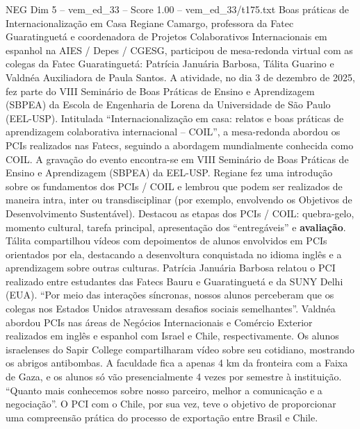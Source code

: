 \begin{textsample}{NEG Dim 5 – vem\_ed\_33 – Score 1.00 – vem\_ed\_33/t175.txt}  \label{ex:f5_neg_069}
Boas práticas de Internacionalização em Casa Regiane Camargo, professora da Fatec Guaratinguetá e coordenadora de Projetos Colaborativos Internacionais em espanhol na AIES / Depes / CGESG, participou de mesa-redonda virtual com as colegas da Fatec Guaratinguetá: Patrícia Januária Barbosa, Tálita Guarino e Valdnéa Auxiliadora de Paula Santos.
A atividade, no dia 3 de dezembro de 2025, fez parte do VIII Seminário de Boas Práticas de Ensino e Aprendizagem (SBPEA) da Escola de Engenharia de Lorena da Universidade de São Paulo (EEL-USP).
Intitulada “Internacionalização em casa: relatos e boas práticas de aprendizagem colaborativa internacional – COIL”, a mesa-redonda abordou os PCIs realizados nas Fatecs, seguindo a abordagem mundialmente conhecida como COIL.
A gravação do evento encontra-se em VIII Seminário de Boas Práticas de Ensino e Aprendizagem (SBPEA) da EEL-USP.
Regiane fez uma introdução sobre os fundamentos dos PCIs / COIL e lembrou que podem ser realizados de maneira intra, inter ou transdisciplinar (por exemplo, envolvendo os Objetivos de Desenvolvimento Sustentável).
Destacou as etapas dos PCIs / COIL: quebra-gelo, momento cultural, tarefa principal, apresentação dos “entregáveis” e \textbf{avaliação}.
Tálita compartilhou vídeos com depoimentos de alunos envolvidos em PCIs orientados por ela, destacando a desenvoltura conquistada no idioma inglês e a aprendizagem sobre outras culturas.
Patrícia Januária Barbosa relatou o PCI realizado entre estudantes das Fatecs Bauru e Guaratinguetá e da SUNY Delhi (EUA). “Por meio das interações síncronas, nossos alunos perceberam que os colegas nos Estados Unidos atravessam desafios sociais semelhantes”.
Valdnéa abordou PCIs nas áreas de Negócios Internacionais e Comércio Exterior realizados em inglês e espanhol com Israel e Chile, respectivamente.
Os alunos israelenses do Sapir College compartilharam vídeo sobre seu cotidiano, mostrando os abrigos antibombas.
A faculdade fica a apenas 4 km da fronteira com a Faixa de Gaza, e os alunos só vão presencialmente 4 vezes por semestre à instituição. “Quanto mais conhecemos sobre nosso parceiro, melhor a comunicação e a negociação”.
O PCI com o Chile, por sua vez, teve o objetivo de proporcionar uma compreensão prática do processo de exportação entre Brasil e Chile.

\end{textsample}
